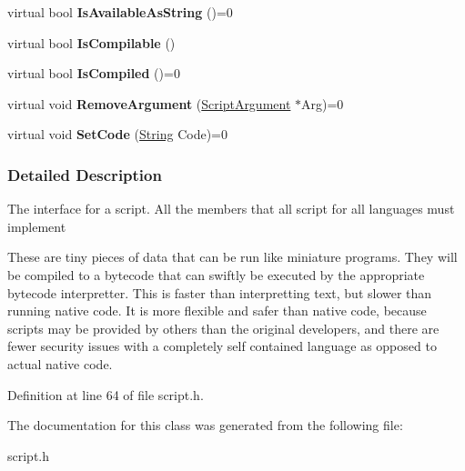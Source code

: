 \begin{DoxyCompactItemize}
\item 
\hypertarget{classMezzanine_1_1Scripting_1_1Script_af7351a14b9f1e56dde085f53723d3b5d}{
virtual bool {\bfseries IsAvailableAsString} ()=0}
\label{classMezzanine_1_1Scripting_1_1Script_af7351a14b9f1e56dde085f53723d3b5d}

\item 
\hypertarget{classMezzanine_1_1Scripting_1_1Script_a33426cd4b08b4078fda249a00c821005}{
virtual bool {\bfseries IsCompilable} ()}
\label{classMezzanine_1_1Scripting_1_1Script_a33426cd4b08b4078fda249a00c821005}

\item 
\hypertarget{classMezzanine_1_1Scripting_1_1Script_ac920f191e8df2814427341e59c423aa6}{
virtual bool {\bfseries IsCompiled} ()=0}
\label{classMezzanine_1_1Scripting_1_1Script_ac920f191e8df2814427341e59c423aa6}

\item 
\hypertarget{classMezzanine_1_1Scripting_1_1Script_ab3ffb918b28e518fa1145253ff37c900}{
virtual void {\bfseries RemoveArgument} (\hyperlink{classMezzanine_1_1Scripting_1_1ScriptArgument}{ScriptArgument} $\ast$Arg)=0}
\label{classMezzanine_1_1Scripting_1_1Script_ab3ffb918b28e518fa1145253ff37c900}

\item 
\hypertarget{classMezzanine_1_1Scripting_1_1Script_aae36c7fa4c78d5aac838bfca7c112ce2}{
virtual void {\bfseries SetCode} (\hyperlink{namespaceMezzanine_acf9fcc130e6ebf08e3d8491aebcf1c86}{String} Code)=0}
\label{classMezzanine_1_1Scripting_1_1Script_aae36c7fa4c78d5aac838bfca7c112ce2}

\end{DoxyCompactItemize}


\subsubsection{Detailed Description}
The interface for a script. All the members that all script for all languages must implement \par
 \par
 These are tiny pieces of data that can be run like miniature programs. They will be compiled to a bytecode that can swiftly be executed by the appropriate bytecode interpretter. This is faster than interpretting text, but slower than running native code. It is more flexible and safer than native code, because scripts may be provided by others than the original developers, and there are fewer security issues with a completely self contained language as opposed to actual native code. 

Definition at line 64 of file script.h.



The documentation for this class was generated from the following file:\begin{DoxyCompactItemize}
\item 
script.h\end{DoxyCompactItemize}
